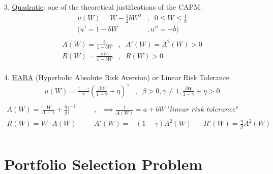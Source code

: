 \documentclass[
14pt,notheorems,hyperref={pdfauthor=whatever}
]{beamer}
\begin{document}
\begin{frame}
3. \underline{Quadratic}: one of the theoretical justifications of the CAPM.\\
\hfill \break
\begin{align*}
    u(W) = W-\frac{1}{2}bW^2 &,\;\;0\leq W \leq \frac{1}{b}\\
    \Bigg(u' = 1-bW&, u''=-b\Bigg)\\
\end{align*}
\begin{align*}
    A(W) = \frac{b}{1-bW}&,\;\;A'(W) = A^2(W)>0\\
    R(W) = \frac{bW}{1-bW}&,\;\;R(W) > 0\\
\end{align*}
\end{frame}

\begin{frame}
4. \underline{HARA} (Hyperbolic Absolute Risk Aversion) or Linear Risk Tolerance\\
\hfill \break
\begin{align*}
    u(W) = \frac{1-\gamma}{\gamma}(\frac{\beta W}{1-\gamma}+\eta)^\gamma &,\;\;\beta>0,\gamma\neq1,\frac{\beta W}{1-\gamma}+\eta>0\\
\end{align*}
\begin{align*}
    A(W) = \Bigg[\frac{W}{1-\gamma}+\frac{\eta}{\beta}\Bigg]^{-1}&,\;\;\implies \frac{1}{A(W)} = a+bW \;\textit{"linear risk tolerance"}\\
    R(W) = W\cdot A(W) \;\;\;\;\;\; &A'(W)=-(1-\gamma)A^2(W) \;\;\;\;\;\; R'(W)=\frac{\eta}{\beta}A^2(W)\\
\end{align*}
\end{frame}

\section{Portfolio Selection Problem}
\end{document}
